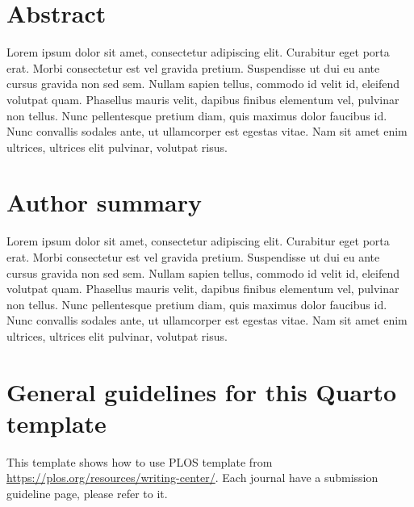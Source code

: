 \documentclass[
  10pt,
  letterpaper,
]{article}
\begin{document}
\section*{Abstract}
Lorem ipsum dolor sit amet, consectetur adipiscing elit. Curabitur eget
porta erat. Morbi consectetur est vel gravida pretium. Suspendisse ut
dui eu ante cursus gravida non sed sem. Nullam sapien tellus, commodo id
velit id, eleifend volutpat quam. Phasellus mauris velit, dapibus
finibus elementum vel, pulvinar non tellus. Nunc pellentesque pretium
diam, quis maximus dolor faucibus id. Nunc convallis sodales ante, ut
ullamcorper est egestas vitae. Nam sit amet enim ultrices, ultrices elit
pulvinar, volutpat risus.

\section*{Author summary}
Lorem ipsum dolor sit amet, consectetur adipiscing elit. Curabitur eget
porta erat. Morbi consectetur est vel gravida pretium. Suspendisse ut
dui eu ante cursus gravida non sed sem. Nullam sapien tellus, commodo id
velit id, eleifend volutpat quam. Phasellus mauris velit, dapibus
finibus elementum vel, pulvinar non tellus. Nunc pellentesque pretium
diam, quis maximus dolor faucibus id. Nunc convallis sodales ante, ut
ullamcorper est egestas vitae. Nam sit amet enim ultrices, ultrices elit
pulvinar, volutpat risus.

\linenumbers\hypertarget{general-guidelines-for-this-quarto-template}{%
\section{General guidelines for this Quarto
template}\label{general-guidelines-for-this-quarto-template}}

This template shows how to use PLOS template from
\url{https://plos.org/resources/writing-center/}. Each journal have a
submission guideline page, please refer to it.
\end{document}
